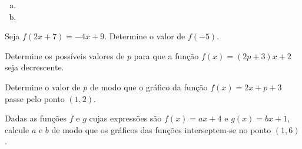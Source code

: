 \begin{secExercicios}
\begin{exer}
\begin{enumerate}[a)]
            \item 

            \item 
        \end{enumerate}
    \end{exer}

    \begin{exer}
        Seja $f(2x+7)=-4x+9$. Determine o valor de $f(-5)$.
    \end{exer}

    \begin{exer}
        Determine os possíveis valores de $p$ para que a função $f(x)=(2p+3)x+2$ seja decrescente.
    \end{exer}

    \begin{exer}
        Determine o valor de $p$ de modo que o gráfico da função $f(x)=2x+p+3$ passe pelo ponto $(1,2)$.
    \end{exer}
    
    \begin{exer}
        Dadas as funções $f$ e $g$ cujas expressões são $f(x)=ax+4$ e $g(x)=bx+1$, calcule $a$ e $b$ de modo que os gráficos das funções interseptem-se no ponto $(1,6)$.
    \end{exer}
    

\end{secExercicios}
